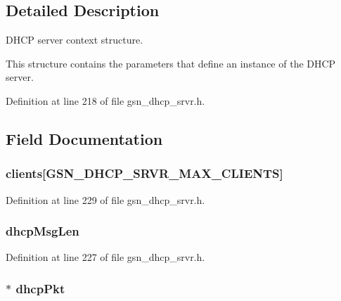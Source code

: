 \subsection{Detailed Description}
DHCP server context structure. 

This structure contains the parameters that define an instance of the DHCP server. 

Definition at line 218 of file gsn\_\-dhcp\_\-srvr.h.



\subsection{Field Documentation}
\hypertarget{a00043_a9cd6bdb415f7200b23fd5e9a2c9cf5e7}{
\subsubsection[{clients}]{ {\bf clients}\mbox{[}GSN\_\-DHCP\_\-SRVR\_\-MAX\_\-CLIENTS\mbox{]}}}
\label{a00043_a9cd6bdb415f7200b23fd5e9a2c9cf5e7}


Definition at line 229 of file gsn\_\-dhcp\_\-srvr.h.

\hypertarget{a00043_ada3b5c6b062e8c88e941dd4fd6cd85b6}{
\subsubsection[{dhcpMsgLen}]{ {\bf dhcpMsgLen}}}
\label{a00043_ada3b5c6b062e8c88e941dd4fd6cd85b6}


Definition at line 227 of file gsn\_\-dhcp\_\-srvr.h.

\hypertarget{a00043_ac271af693c1a7a5d647f0f1b76e2e633}{
\subsubsection[{dhcpPkt}]{$\ast$ {\bf dhcpPkt}}}
\label{a00043_ac271af693c1a7a5d647f0f1b76e2e633}


